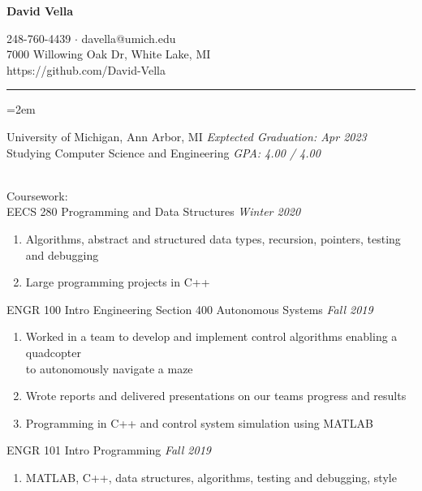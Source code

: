 \documentclass[12pt]{article}
\newcommand{\rheader}[1] { 
    \noindent{ \large \textbf{#1} \par }
    \vspace{-10pt}
    \noindent \rule{7.5in}{0.5pt} 
}
\newcommand{\rdate}[1]{
    \hfill \textit{#1}
}
\newcommand{\ritem} {
    \vspace{-10pt} \item
}
\newenvironment{rsection} {
    \vspace{-5pt}
    \par \medskip
    \leftskip=2em
    \noindent \ignorespaces
} {
    \par \medskip
    \vspace{5pt}
}
\newenvironment{rlist} {
    \begin{enumerate}[leftmargin=0.75in, label=$\bullet$]
} {
    \end{enumerate}
    \vspace{-10pt}
}
\begin{document}
\begin{center}
    {\Large \textbf{David Vella} \par}
    \vspace{5pt}
    248-760-4439 $\cdot$ davella@umich.edu \\
    7000 Willowing Oak Dr, White Lake, MI \\
    https://github.com/David-Vella
\end{center}

\vspace{-10pt}

\rheader{EDUCATION}
\begin{rsection}
    University of Michigan, Ann Arbor, MI \rdate{Exptected Graduation: Apr 2023} \\
    Studying Computer Science and Engineering \rdate{GPA: 4.00 / 4.00}
    \vspace{5pt} \\
    \noindent Coursework: \\
    EECS 280 Programming and Data Structures \rdate{Winter 2020}
    \begin{rlist}
        \ritem Algorithms, abstract and structured data types, recursion, pointers, testing and debugging
        \ritem Large programming projects in C++
    \end{rlist}
    ENGR 100 Intro Engineering Section 400 Autonomous Systems \rdate{Fall 2019}
    \begin{rlist}
        \ritem Worked in a team to develop and implement control algorithms enabling a quadcopter \\ to autonomously navigate a maze
        \ritem Wrote reports and delivered presentations on our teams progress and results
        \ritem Programming in C++ and control system simulation using MATLAB 
    \end{rlist}
    ENGR 101 Intro Programming \rdate{Fall 2019}
    \begin{rlist}
        \ritem MATLAB, C++, data structures, algorithms, testing and debugging, style 
    \end{rlist}
\end{rsection}
\end{document}
